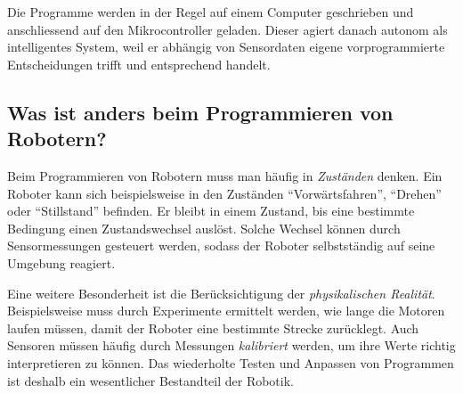 \begin{center}
\end{center}

Die Programme werden in der Regel auf einem Computer geschrieben und anschliessend auf den Mikrocontroller geladen. Dieser agiert danach autonom als intelligentes System,
weil er abhängig von Sensordaten eigene vorprogrammierte Entscheidungen
trifft und entsprechend handelt.


\subsection*{Was ist anders beim Programmieren von Robotern?}

Beim Programmieren von Robotern muss man häufig in
\emph{Zuständen} denken. Ein Roboter kann sich beispielsweise
in den Zuständen \enquote{Vorwärtsfahren}, \enquote{Drehen}
oder \enquote{Stillstand} befinden. Er bleibt in einem Zustand,
bis eine bestimmte Bedingung einen Zustandswechsel auslöst.
Solche Wechsel können durch Sensormessungen gesteuert werden,
sodass der Roboter selbstständig auf seine Umgebung reagiert.

Eine weitere Besonderheit ist die Berücksichtigung der
\emph{physikalischen Realität}. Beispielsweise muss durch
Experimente ermittelt werden, wie lange die Motoren laufen
müssen, damit der Roboter eine bestimmte Strecke zurücklegt.
Auch Sensoren müssen häufig durch Messungen \emph{kalibriert}
werden, um ihre Werte richtig interpretieren zu können.
Das wiederholte Testen und Anpassen von Programmen ist
deshalb ein wesentlicher Bestandteil der Robotik.


